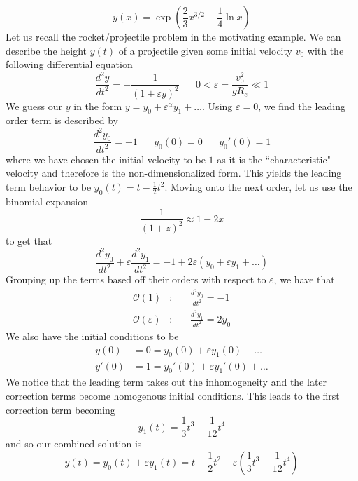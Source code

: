 \documentclass{article}
\newcommand{\odt}[2]{\frac{d^2 #1}{d #2 ^2}}
\newcommand{\twen}{\hspace{20pt}}
\begin{document}
\begin{equation*}
    y(x)=\exp \left( \frac{2}{3}x^{3/2}-\frac{1}{4}\ln x \right)
\end{equation*}
Let us recall the rocket/projectile problem in the motivating example. We can describe the height $y(t)$ of a projectile given some initial velocity $v_0$ with the following differential equation 
\begin{equation*}
    \odt{y}{t} = -\frac{1}{(1+\varepsilon y)^2} \twen 0<\varepsilon =\frac{v_0^2}{gR_e} \ll 1
\end{equation*}
We guess our $y$ in the form $y=y_0+\varepsilon^{\alpha}y_1+\ldots$. Using $\varepsilon=0$, we find the leading order term is described by 
\begin{equation*}
    \odt{y_0}{t} = -1 \twen y_0(0)=0 \twen y_0'(0)=1
\end{equation*}
where we have chosen the initial velocity to be $1$ as it is the ``characteristic" velocity and therefore is the non-dimensionalized form. This yields the leading term behavior to be $y_0(t)=t-\frac{1}{2}t^2$. Moving onto the next order, let us use the binomial expansion 
\begin{equation*}
    \frac{1}{(1+z)^2} \approx 1-2x
\end{equation*}
to get that 
\begin{equation*}
    \odt{y_0}{t} +\varepsilon\odt{y_1}{t}=-1+2\varepsilon(y_0+\varepsilon y_1+\ldots) 
\end{equation*}
Grouping up the terms based off their orders with respect to $\varepsilon$, we have that 
\begin{equation*}
    \begin{split}
        \mathcal O(1)& :\twen \odt{y_0}{t}=-1 \\
        \mathcal O(\varepsilon)&: \twen \odt{y_1}{t}=2y_0
    \end{split}
\end{equation*}
We also have the initial conditions to be 
\begin{equation*}
    \begin{split}
        y(0)&=0=y_0(0)+\varepsilon y_1(0)+\ldots \\
        y'(0)&=1=y_0'(0)+\varepsilon y_1'(0) +\ldots
    \end{split}
\end{equation*}
We notice that the leading term takes out the inhomogeneity and the later correction terms become homogenous initial conditions. This leads to the first correction term becoming 
\begin{equation*}
    y_1(t) = \frac{1}{3}t^3-\frac{1}{12}t^4
\end{equation*}
and so our combined solution is 
\begin{equation*}
    y(t)=y_0(t)+\varepsilon y_1(t) = t-\frac{1}{2}t^2+\varepsilon\left(\frac{1}{3}t^3-\frac{1}{12}t^4 \right)
\end{equation*}
\end{document}

